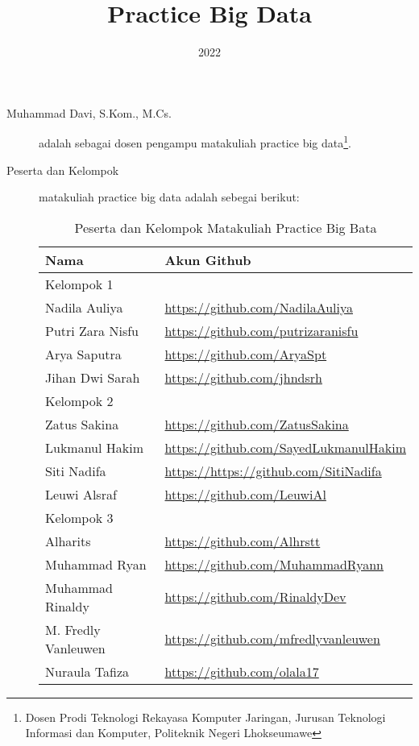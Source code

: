 \documentclass[a4paper]{tufte-handout}
\title{Practice Big Data}
\date{2022}
\begin{document}
\maketitle


\begin{projects}
\begin{description}
\item [Muhammad Davi, S.Kom., M.Cs.] adalah sebagai dosen pengampu matakuliah practice big data\footnote{Dosen Prodi Teknologi Rekayasa Komputer Jaringan, Jurusan Teknologi Informasi dan Komputer, Politeknik Negeri Lhokseumawe}.
\item [Peserta dan Kelompok] matakuliah practice big data adalah sebegai berikut:

\begin{table}[!ht]
\caption{Peserta dan Kelompok Matakuliah Practice Big Bata}
\label{tab:peserta}
\centering
\begin{tabular}{ll} 
\toprule
Nama &	Akun Github\\
\midrule
Kelompok 1\\
\midrule
Nadila Auliya	& \url{https://github.com/NadilaAuliya} \\
Putri Zara Nisfu		& \url{https://github.com/putrizaranisfu} \\
Arya Saputra			& \url{https://github.com/AryaSpt} \\
Jihan Dwi Sarah			& \url{https://github.com/jhndsrh} \\
\midrule
Kelompok 2\\
\midrule
Zatus Sakina				& \url{https://github.com/ZatusSakina} \\
Lukmanul Hakim			& \url{https://github.com/SayedLukmanulHakim} \\
Siti Nadifa			& \url{https://https://github.com/SitiNadifa} \\
Leuwi Alsraf		& \url{https://github.com/LeuwiAl} \\
\midrule
Kelompok 3\\
\midrule
Alharits			& \url{https://github.com/Alhrstt} \\
Muhammad Ryan			& \url{https://github.com/MuhammadRyann} \\
Muhammad Rinaldy	& \url{https://github.com/RinaldyDev} \\
M. Fredly Vanleuwen			& \url{https://github.com/mfredlyvanleuwen} \\
Nuraula Tafiza			& \url{https://github.com/olala17} \\

\end{tabular}
\end{table}
\end{description}
\end{projects}
\end{document}
